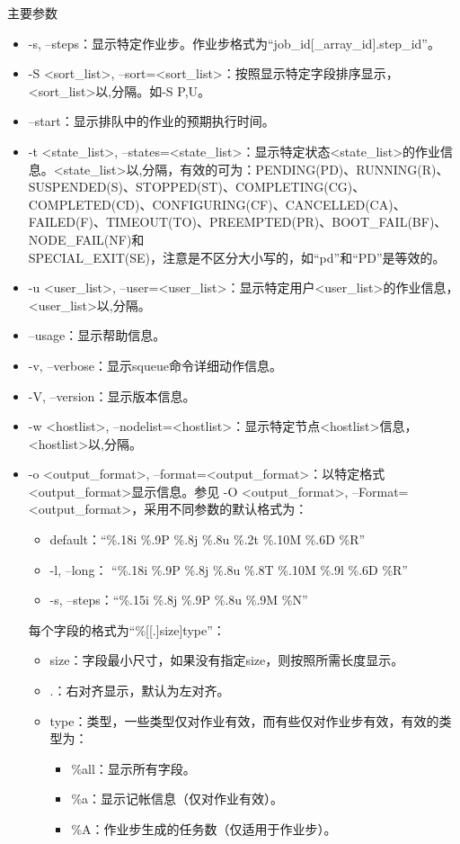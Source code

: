 \begin{frame}[fragile]{主要参数}
\begin{itemize}
	\item -s, --steps：显示特定作业步。作业步格式为``job\_id[\_array\_id].step\_id''。
	\item -S <sort\_list>, --sort=<sort\_list>：按照显示特定字段排序显示，<sort\_list>以,分隔。如-S P,U。
	\item --start：显示排队中的作业的预期执行时间。
	\item -t <state\_list>, --states=<state\_list>：显示特定状态<state\_list>的作业信息。<state\_list>以,分隔，有效的可为：PENDING(PD)、RUNNING(R)、SUSPENDED(S)、STOPPED(ST)、COMPLETING(CG)、COMPLETED(CD)、CONFIGURING(CF)、CANCELLED(CA)、FAILED(F)、TIMEOUT(TO)、PREEMPTED(PR)、BOOT\_FAIL(BF)、NODE\_FAIL(NF)和\\SPECIAL\_EXIT(SE)，注意是不区分大小写的，如``pd''和``PD''是等效的。
	\item -u <user\_list>, --user=<user\_list>：显示特定用户<user\_list>的作业信息，<user\_list>以,分隔。
	\item --usage：显示帮助信息。
	\item -v, --verbose：显示squeue命令详细动作信息。
	\item -V, --version：显示版本信息。
	\item -w <hostlist>, --nodelist=<hostlist>：显示特定节点<hostlist>信息，<hostlist>以,分隔。
	\item -o <output\_format>, --format=<output\_format>：以特定格式<output\_format>显示信息。参见 -O <output\_format>, --Format=<output\_format>，采用不同参数的默认格式为：
	\begin{itemize}
		\item default：``\%.18i \%.9P \%.8j \%.8u \%.2t \%.10M \%.6D \%R''
		\item -l, --long： ``\%.18i \%.9P \%.8j \%.8u \%.8T \%.10M \%.9l \%.6D \%R''
		\item -s, --steps：``\%.15i \%.8j \%.9P \%.8u \%.9M \%N''
	\end{itemize}
	每个字段的格式为``\%[[.]size]type''：
\begin{itemize}
	\item size：字段最小尺寸，如果没有指定size，则按照所需长度显示。
    \item .：右对齐显示，默认为左对齐。
	\item type：类型，一些类型仅对作业有效，而有些仅对作业步有效，有效的类型为：
\begin{itemize}
	\item \%all：显示所有字段。
    \item \%a：显示记帐信息（仅对作业有效）。
    \item \%A：作业步生成的任务数（仅适用于作业步）。

\end{itemize}
\end{itemize}
\end{itemize}
\end{frame}
